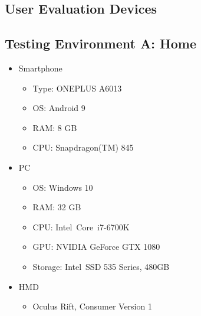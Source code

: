 
\begin{appendices}
  \chapter{User Evaluation Devices}\label{chapter:append-user-eval-devices}
  \section{Testing Environment A: Home}
  \begin{itemize}
    \item Smartphone
    \begin{itemize}
      \item Type: ONEPLUS A6013
      \item \ac{OS}: Android 9
      \item RAM: 8 GB
      \item CPU: Snapdragon(TM) 845 %
    \end{itemize}
    \item \ac{PC}
    \begin{itemize}
      \item \ac{OS}: Windows 10
      \item RAM: 32 GB
      \item CPU: Intel\textregistered\ Core\texttrademark\ i7-6700K %
      \item GPU: NVIDIA GeForce GTX 1080
      \item Storage: Intel\textregistered\ SSD 535 Series, 480GB
    \end{itemize}
    \item \ac{HMD}
    \begin{itemize}
      \item Oculus Rift, Consumer Version 1
    \end{itemize}
  \end{itemize}

  \filbreak{}

\end{appendices}
